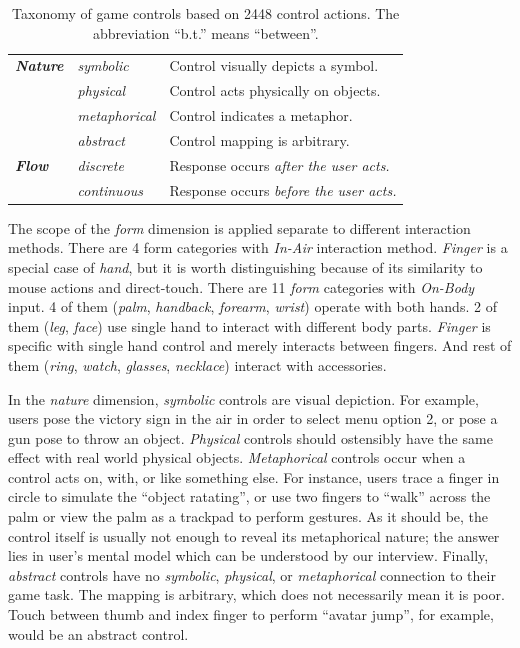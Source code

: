 \documentclass{sigchi}
\begin{document}
\begin{table}
\begin{adjustwidth}{-0.4cm}{}
\begin{tabular}{|l|l|l|}
      \Xhline{4\arrayrulewidth}
        \textbf{\em{Nature}} & \em{symbolic} & Control visually depicts a symbol.\\ \cline{2-3} 
             & \em{physical} & Control acts physically on objects.\\ \cline{2-3} 
             & \em{metaphorical} & Control indicates a metaphor.\\ \cline{2-3} 
             & \em{abstract} & Control mapping is arbitrary.\\
      \Xhline{4\arrayrulewidth}
        \textbf{\em{Flow}} & \em{discrete} & Response occurs \em{after} the user acts.\\ \cline{2-3} 
             & \em{continuous} & Response occurs \em{before} the user acts.\\
      \hline
    \end{tabular}
    \caption{Taxonomy of game controls based on 2448 control actions. The abbreviation ``b.t.'' means ``between''.}
    \label{tab:taxonomy}
    \end{adjustwidth}
  \end{table}

  The scope of the \emph{form} dimension is applied separate to different interaction methods. There are 4 form categories with \emph{In-Air} interaction method. \emph{Finger} is a special case of \emph{hand}, but it is worth distinguishing because of its similarity to mouse actions and direct-touch. There are 11 \emph{form} categories with \emph{On-Body} input. 4 of them (\emph{palm}, \emph{handback}, \emph{forearm}, \emph{wrist}) operate with both hands. 2 of them (\emph{leg}, \emph{face}) use single hand to interact with different body parts. \emph{Finger} is specific with single hand control and merely interacts between fingers. And rest of them (\emph{ring}, \emph{watch}, \emph{glasses}, \emph{necklace}) interact with accessories.


  In the \emph{nature} dimension, \emph{symbolic} controls are visual depiction. For example, users pose the victory sign in the air in order to select menu option 2, or pose a gun pose to throw an object. \emph{Physical} controls should ostensibly have the same effect with real world physical objects. \emph{Metaphorical} controls occur when a control acts on, with, or like something else. For instance, users trace a finger in circle to simulate the ``object ratating'', or use two fingers to ``walk'' across the palm or view the palm as a trackpad to perform gestures. As it should be, the control itself is usually not enough to reveal its metaphorical nature; the answer lies in user's mental model which can be understood by our interview. Finally, \emph{abstract} controls have no \emph{symbolic}, \emph{physical}, or \emph{metaphorical} connection to their game task. The mapping is arbitrary, which does not necessarily mean it is poor. Touch between thumb and index finger to perform ``avatar jump'', for example, would be an abstract control.
\end{document}
